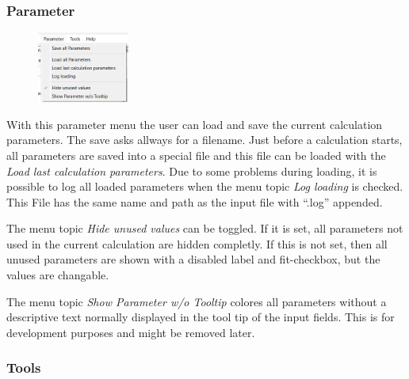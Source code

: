 \documentclass[11pt]{article} %
\begin{document}
\subsubsection{Parameter}

\begin{figure}
  \begin{center}
    \includegraphics[width=0.27\textwidth]{menu-parameter.png}
  \end{center}
\end{figure}
With this parameter menu the user can load and save the current calculation parameters. The save asks allways for a filename. Just before a calculation starts, all parameters are saved into a special file and this file can be loaded with the {\it Load last calculation parameters}.
Due to some problems during loading, it is possible to log all loaded parameters when the menu topic {\it Log loading} is checked. This File has the same name and path as the input file with ``.log'' appended.

The menu topic {\it Hide unused values} can be toggled. If it is set, all parameters not used in the current calculation are hidden completly. If this is not set, then all unused parameters are shown with a disabled label and fit-checkbox, but the values are changable.

The menu topic {\it Show Parameter w/o Tooltip} colores all parameters without a descriptive text normally displayed in the tool tip of the input fields. This is for development purposes and might be removed later.

\subsubsection{Tools}
\end{document}
